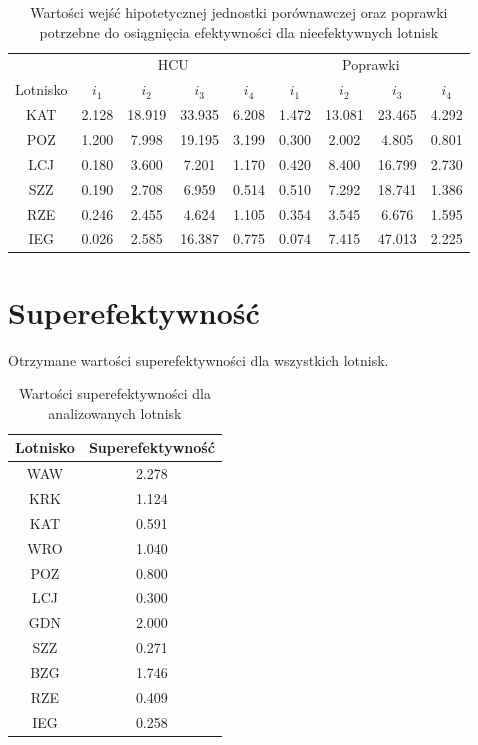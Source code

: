 \documentclass[a4paper,12pt]{article}
\begin{document}
\begin{table}[H]
    \centering
    \begin{tabular}{c|cccc|cccc}
    \hline
        & \multicolumn{4}{c|}{HCU} & \multicolumn{4}{c}{Poprawki}  \\
         Lotnisko & $i_1$ & $i_2$ & $i_3$ & $i_4$ & $i_1$ & $i_2$ & $i_3$ & $i_4$ \\ \hline
         KAT & 2.128 & 18.919 & 33.935 & 6.208 & 1.472 & 13.081 & 23.465 & 4.292 \\
         POZ & 1.200 & 7.998 & 19.195 & 3.199 & 0.300 & 2.002 & 4.805 & 0.801 \\
         LCJ & 0.180 & 3.600 & 7.201 & 1.170 & 0.420 & 8.400 & 16.799 & 2.730 \\
         SZZ & 0.190 & 2.708 & 6.959 & 0.514 & 0.510 & 7.292 & 18.741 & 1.386 \\
         RZE & 0.246 & 2.455 & 4.624 & 1.105 & 0.354 & 3.545 & 6.676 & 1.595 \\
         IEG & 0.026 & 2.585 & 16.387 & 0.775 & 0.074 & 7.415 & 47.013 & 2.225 \\
    \end{tabular}
    \caption{Wartości wejść hipotetycznej jednostki porównawczej oraz poprawki potrzebne do osiągnięcia efektywności dla nieefektywnych lotnisk }
    \label{tab:airports-hcu-and-improvements}
\end{table}

\section{Superefektywność}

Otrzymane wartości superefektywności dla wszystkich lotnisk.

\begin{table}[H]
    \centering
    \begin{tabular}{c|c}
    \hline
         Lotnisko & Superefektywność  \\ \hline
         WAW & 2.278 \\
         KRK & 1.124 \\
         KAT & 0.591 \\
         WRO & 1.040 \\
         POZ & 0.800 \\
         LCJ & 0.300 \\
         GDN & 2.000 \\
         SZZ & 0.271 \\
         BZG & 1.746 \\
         RZE & 0.409 \\
         IEG & 0.258 \\
    \end{tabular}
    \caption{Wartości superefektywności dla analizowanych lotnisk}
    \label{tab:airports-super-efficiency}
\end{table}
\end{document}
